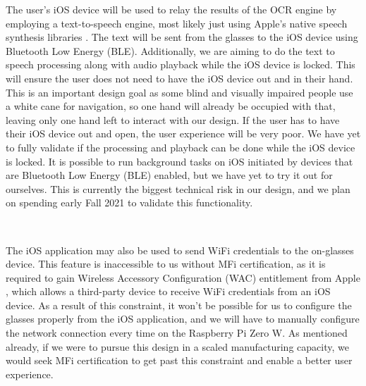 \documentclass[a4paper,11pt]{article}
\begin{document}
\noindent
The user's iOS device will be used to relay the results of the OCR engine by employing a text-to-speech engine, most likely just using Apple's native speech synthesis libraries \cite{apple-speech-synthesis}. The text will be sent from the glasses to the iOS device using Bluetooth Low Energy (BLE). Additionally, we are aiming to do the text to speech processing along with audio playback while the iOS device is locked. This will ensure the user does not need to have the iOS device out and in their hand. This is an important design goal as some blind and visually impaired people use a white cane for navigation, so one hand will already be occupied with that, leaving only one hand left to interact with our design. If the user has to have their iOS device out and open, the user experience will be very poor. We have yet to fully validate if the processing and playback can be done while the iOS device is locked. It is possible to run background tasks on iOS initiated by devices that are Bluetooth Low Energy (BLE) enabled, but we have yet to try it out for ourselves. This is currently the biggest technical risk in our design, and we plan on spending early Fall 2021 to validate this functionality.

\

\noindent
The iOS application may also be used to send WiFi credentials to the on-glasses device. This feature is inaccessible to us without MFi certification, as it is required to gain Wireless Accessory Configuration (WAC) entitlement from Apple \cite{apple-wac}, which allows a third-party device to receive WiFi credentials from an iOS device. As a result of this constraint, it won't be possible for us to configure the glasses properly from the iOS application, and we will have to manually configure the network connection every time on the Raspberry Pi Zero W. As mentioned already, if we were to pursue this design in a scaled manufacturing capacity, we would seek MFi certification to get past this constraint and enable a better user experience.

\
\end{document}
